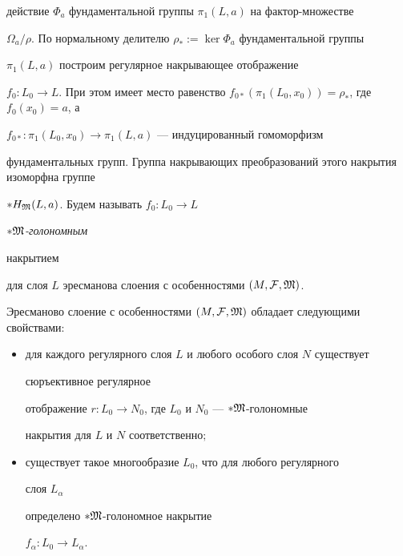 действие $\Phi_a$ фундаментальной группы $\pi_1(L,a)$ на фактор-множестве


$\Omega_a/\rho$. По нормальному делителю $\rho_*:=\ker\Phi_a$ фундаментальной группы


$\pi_1(L,a)$ построим регулярное накрывающее отображение


$f_0: L_0\to L$. При этом имеет место равенство $f_{0*}(\pi_1(L_0,x_0))=\rho_*$, где $f_0(x_0)=a$, а


$f_{0*}:\pi_1(L_0,x_0)\to\pi_1(L,a)$ --- индуцированный гомоморфизм


фундаментальных групп. Группа накрывающих преобразований этого накрытия изоморфна группе


$*H_{\frak M}(L,a)$. Будем называть $f_0: L_0\to L$ \ {\it $*\frak M$-голономным


накрытием} для слоя $L$ эресманова слоения с особенностями $(M,{\cal F},\frak M)$.








\begin{thm}\label{T2}


Эресманово слоение с особенностями $(M,{\cal F},\frak M)$ обладает следующими свойствами\/${:}$


\begin{itemize}


\item[1)] для каждого регулярного слоя $L$ и любого особого слоя $N$ существует


сюръективное регулярное


отображение $r: L_0\to N_0$, где $L_0$ и $N_0$ --- $*\frak M$-голономные


накрытия для $L$ и $N$ соответственно$;$


\item[2)] существует такое многообразие $L_0$, что для любого регулярного


слоя $L_{\alpha}$


определено $*\frak M$-голономное накрытие


$f_{\alpha}: L_0\to L_{\alpha}$.


\end{itemize}


\end{thm}





